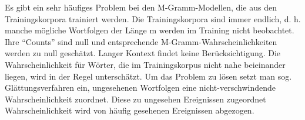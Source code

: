 Es gibt ein sehr h\"aufiges Problem bei den M-Gramm-Modellen, die aus den Trainingskorpora trainiert werden. Die Trainingskorpora sind immer endlich, d. h.  manche m\"ogliche Wortfolgen der L\"ange m werden im Training nicht beobachtet. Ihre "`Counts"' sind null und entsprechende M-Gramm-Wahrscheinlichkeiten werden zu null gesch\"atzt. Langer Kontext findet keine Ber\"ucksichtigung. Die Wahrscheinlichkeit f\"ur W\"orter, die im Trainingskorpus nicht nahe beieinander liegen, wird in der Regel untersch\"atzt.
Um das Problem zu l\"osen setzt man sog. Gl\"attungsverfahren ein, ungesehenen Wortfolgen eine nicht-verschwindende Wahrscheinlichkeit zuordnet. Diese zu ungesehen Ereignissen zugeordnet Wahrscheinlichkeit wird von h\"aufig gesehenen Ereignissen abgezogen.
